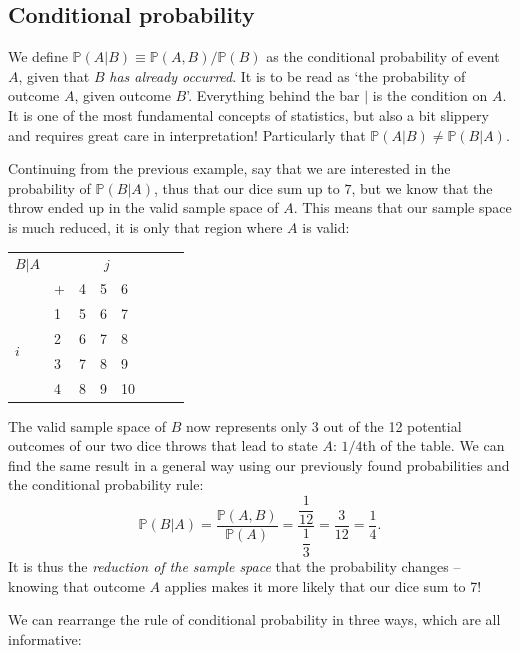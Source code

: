 \documentclass{article}
\begin{document}
\subsection{Conditional probability}
We define $\mathbb{P}(A|B)\equiv\mathbb{P}(A,B)/\mathbb{P}(B)$ as the conditional probability of event $A$, given that $B$ \textit{has already occurred}. It is to be read as `the probability of outcome $A$, given outcome $B$'. Everything behind the bar $|$ is the condition on $A$. It is one of the most fundamental concepts of statistics, but also a bit slippery and requires great care in interpretation! Particularly that $\mathbb{P}(A|B)\neq\mathbb{P}(B|A)$.
\begin{testexample}
    Continuing from the previous example, say that we are interested in the probability of $\mathbb{P}(B|A)$, thus that our dice sum up to $7$, but we know that the throw ended up in the valid sample space of $A$. This means that our sample space is much reduced, it is only that region where $A$ is valid:
    \begin{center}
    \begin{tabular}{@{}ll|llllll}
\toprule
$B|A$ & & \multicolumn{3}{c}{$j$} \\ 
 & + & 4 & 5 & 6 \\ \hline
\multirow{4}{*}{$i$} & 1 & 5 & 6 & \cellcolor{gray!20}7 \\
  & 2 & 6 & \cellcolor{gray!20}7 & 8 \\
  & 3 & \cellcolor{gray!20}7 & 8 & 9 \\
  & 4 & 8 & 9 & 10 \\ \bottomrule
\end{tabular}
\end{center}
The valid sample space of $B$ now represents only 3 out of the 12 potential outcomes of our two dice throws that lead to state $A$: $1/4$th of the table. We can find the same result in a general way using our previously found probabilities and the conditional probability rule:
\begin{equation}
    \mathbb{P}(B|A)=\frac{\mathbb{P}(A,B)}{\mathbb{P}(A)}=\frac{\dfrac{1}{12} }{\dfrac{1}{3} }=\frac{3}{12}=\frac{1}{4}.
\end{equation}
It is thus the \textit{reduction of the sample space} that the probability changes -- knowing that outcome $A$ applies makes it more likely that our dice sum to 7!
\end{testexample}
{\flushleft We} can rearrange the rule of conditional probability in three ways, which are all informative:
\end{document}
